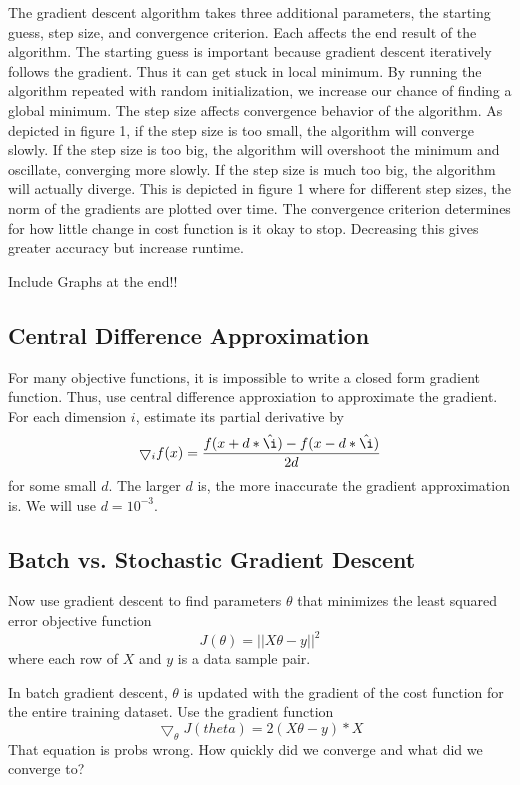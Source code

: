 \documentclass[a4paper,twoside]{article}
\begin{document}
The gradient descent algorithm takes three additional parameters, the starting guess, step size, and convergence criterion. Each affects the end result of the algorithm. The starting guess is important because gradient descent iteratively follows the gradient. Thus it can get stuck in local minimum. By running the algorithm repeated with random initialization, we increase our chance of finding a global minimum. The step size affects convergence behavior of the algorithm. As depicted in figure 1, if the step size is too small, the algorithm will converge slowly. If the step size is too big, the algorithm will overshoot the minimum and oscillate, converging more slowly. If the step size is much too big, the algorithm will actually diverge. This is depicted in figure 1 where for different step sizes, the norm of the gradients are plotted over time. The convergence criterion determines for how little change in cost function is it okay to stop. Decreasing this gives greater accuracy but increase runtime.

Include Graphs at the end!!

\subsection{Central Difference Approximation}

For many objective functions, it is impossible to write a closed form gradient function. Thus, use central difference approxiation to approximate the gradient. For each dimension $i$, estimate its partial derivative by 
\begin{equation}
\bigtriangledown_i f(x) = \frac{f(x+d*\hat{\i}) - f(x-d*\hat{\i})}{2d}
\end{equation}
for some small $d$. The larger $d$ is, the more inaccurate the gradient approximation is. We will use $d = 10^{-3}$.

\subsection{Batch vs. Stochastic Gradient Descent}
Now use gradient descent to find parameters $\theta$ that minimizes the least squared error objective function
\begin{equation}
J(\theta) = ||X\theta - y||^2
\end{equation}
where each row of $X$ and $y$ is a data sample pair. 

In batch gradient descent, $\theta$ is updated with the gradient of the cost function for the entire training dataset.
Use the gradient function
\begin{equation}
\bigtriangledown_\theta J(theta) = 2 (X\theta - y) * X
\end{equation}
That equation is probs wrong.
How quickly did we converge and what did we converge to? 
\end{document}
